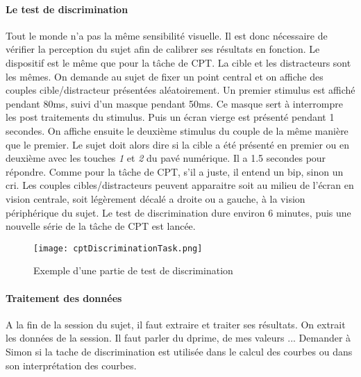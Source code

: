 \paragraph{Le test de discrimination}Tout le monde n'a pas la même sensibilité visuelle. Il est donc nécessaire de vérifier la perception du sujet afin de calibrer ses résultats en
fonction. Le dispositif est le même que pour la tâche de CPT. La cible et les distracteurs sont les mêmes. On demande au sujet de fixer un point central et on affiche des couples
cible/distracteur présentées aléatoirement. Un premier stimulus est affiché pendant 80ms, suivi d'un masque pendant 50ms. Ce masque sert à interrompre les post traitements du
stimulus. Puis un écran vierge est présenté pendant 1 secondes. On affiche ensuite le deuxième stimulus du couple de la même manière que le premier. Le sujet doit alors dire si la
cible a été présenté en premier ou en deuxième avec les touches \emph{1} et \emph{2} du pavé numérique. Il a 1.5 secondes pour répondre. Comme pour la tâche de CPT, s'il a juste, il
entend un bip, sinon un cri. Les couples cibles/distracteurs peuvent apparaitre soit au milieu de l'écran en vision centrale, soit légèrement décalé a droite ou a gauche, à la vision
périphérique du sujet. Le test de discrimination dure environ 6 minutes, puis une nouvelle série de la tâche de CPT est lancée.

\begin{figure}[H]
    \begin{center}
    \texttt{[image: cptDiscriminationTask.png]}
    \end{center}
    \caption{Exemple d'une partie de test de discrimination}
\label{CptDiscriminationTask}
\end{figure}

\paragraph{Traitement des données}A la fin de la session du sujet, il faut extraire et traiter ses résultats. 
On extrait les données de la session. Il faut parler du dprime, de mes valeurs ... Demander à Simon si la tache de discrimination est utilisée dans le
calcul des courbes ou dans son interprétation des courbes.

